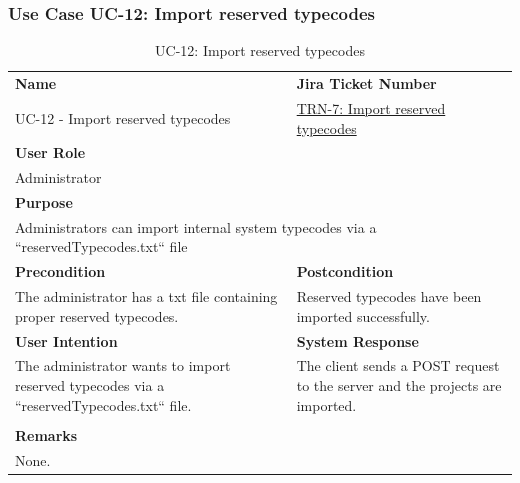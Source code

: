 \subsubsection{Use Case UC-12: Import reserved typecodes}\label{subsubsec:use-case-uc-12:-import-reserved-typecodes}

\begin{table}[H]
    \centering
    \begin{tabular}{|p{}|p{}|}

        \hline
        \rowcolor{gray!50}\textbf{Name} & \rowcolor{gray!50}\textbf{Jira Ticket Number} \\
        UC-12 - Import reserved typecodes
        &
        \href{https://fh-burgenland.atlassian.net/browse/TRN-7}{TRN-7: Import reserved typecodes} \\ \hline

        \multicolumn{2}{|l|}{\rowcolor{gray!50}\textbf{User Role}} \\
        \multicolumn{2}{|l|}{Administrator} \\ \hline

        \multicolumn{2}{|l|}{\rowcolor{gray!50}\textbf{Purpose}} \\
        \multicolumn{2}{|p{1\textwidth}|}{Administrators can import internal system typecodes via a ``reservedTypecodes.txt`` file} \\ \hline

        \rowcolor{gray!50}\textbf{Precondition} & \rowcolor{gray!50}\textbf{Postcondition} \\
        The administrator has a txt file containing proper reserved typecodes.
        &
        Reserved typecodes have been imported successfully.\\ \hline

        \rowcolor{gray!50}\textbf{User Intention} & \rowcolor{gray!50}\textbf{System Response} \\
        The administrator wants to import reserved typecodes via a ``reservedTypecodes.txt`` file.
        &
        The client sends a POST request to the server and the projects are imported. \\ \hline

        & \\ \hline

        \multicolumn{2}{|l|}{\rowcolor{gray!50}\textbf{Remarks}} \\
        \multicolumn{2}{|p{1\textwidth}|}{None.} \\ \hline
    \end{tabular}
    \caption{UC-12: Import reserved typecodes}
    \label{tab:uc-import-reserved-typecodes}
\end{table}

